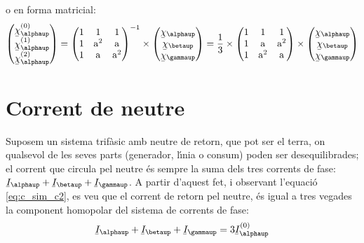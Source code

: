 o en forma matricial:
\begin{equation}
   \begin{pmatrix}
     \cmplx{\chi}_\alphaup\ap{(0)} \\
     \cmplx{\chi}_\alphaup\ap{(1)} \\
     \cmplx{\chi}_\alphaup\ap{(2)}
   \end{pmatrix} =
   \begin{pmatrix}
     1 & 1 & 1 \\
     1 & \au^2 & \au\\
     1 & \au & \au^2
   \end{pmatrix}^{-1} \times
   \begin{pmatrix}
     \cmplx{\chi}_\alphaup \\
     \cmplx{\chi}_\betaup \\
     \cmplx{\chi}_\gammaup
   \end{pmatrix} =  \frac{1}{3} \times
   \begin{pmatrix}
     1 & 1 & 1 \\
     1 & \au & \au^2 \\
     1 & \au^2 & \au
   \end{pmatrix} \times
   \begin{pmatrix}
     \cmplx{\chi}_\alphaup \\
     \cmplx{\chi}_\betaup \\
     \cmplx{\chi}_\gammaup
   \end{pmatrix}
\end{equation}

\section{Corrent de neutre} 

Suposem un sistema trif\`{a}sic amb neutre de retorn, que pot ser el
terra, on qualsevol de les seves parts (generador, l\'{\i}nia o consum)
poden ser desequilibrades; el corrent que circula pel neutre \'{e}s
sempre la suma dels tres corrents de fase: $\cmplx{I}_\alphaup+
\cmplx{I}_\betaup+\cmplx{I}_\gammaup$. A partir d'aquest fet, i
observant l'equaci\'{o} \eqref{eq:c_sim_c2}, es veu que el corrent de
retorn pel neutre, \'{e}s igual a tres vegades la component homopolar
del sistema de corrents de fase:
\begin{equation}
    \cmplx{I}_\alphaup+\cmplx{I}_\betaup+\cmplx{I}_\gammaup =3 \cmplx{I}_\alphaup\ap{(0)}
\end{equation}

